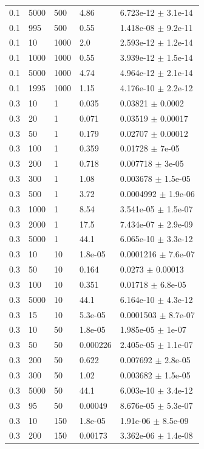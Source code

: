 \begin{longtable}{lllll}
	0.1 & 5000 & 500 & 4.86 & 6.723e-12 $\pm$ 3.1e-14 \\
	0.1 & 995 & 500 & 0.55 & 1.418e-08 $\pm$ 9.2e-11 \\
	0.1 & 10 & 1000 & 2.0 & 2.593e-12 $\pm$ 1.2e-14 \\
	0.1 & 1000 & 1000 & 0.55 & 3.939e-12 $\pm$ 1.5e-14 \\
	0.1 & 5000 & 1000 & 4.74 & 4.964e-12 $\pm$ 2.1e-14 \\
	0.1 & 1995 & 1000 & 1.15 & 4.176e-10 $\pm$ 2.2e-12 \\
	0.3 & 10 & 1 & 0.035 & 0.03821 $\pm$ 0.0002 \\
	0.3 & 20 & 1 & 0.071 & 0.03519 $\pm$ 0.00017 \\
	0.3 & 50 & 1 & 0.179 & 0.02707 $\pm$ 0.00012 \\
	0.3 & 100 & 1 & 0.359 & 0.01728 $\pm$ 7e-05 \\
	0.3 & 200 & 1 & 0.718 & 0.007718 $\pm$ 3e-05 \\
	0.3 & 300 & 1 & 1.08 & 0.003678 $\pm$ 1.5e-05 \\
	0.3 & 500 & 1 & 3.72 & 0.0004992 $\pm$ 1.9e-06 \\
	0.3 & 1000 & 1 & 8.54 & 3.541e-05 $\pm$ 1.5e-07 \\
	0.3 & 2000 & 1 & 17.5 & 7.434e-07 $\pm$ 2.9e-09 \\
	0.3 & 5000 & 1 & 44.1 & 6.065e-10 $\pm$ 3.3e-12 \\
	0.3 & 10 & 10 & 1.8e-05 & 0.0001216 $\pm$ 7.6e-07 \\
	0.3 & 50 & 10 & 0.164 & 0.0273 $\pm$ 0.00013 \\
	0.3 & 100 & 10 & 0.351 & 0.01718 $\pm$ 6.8e-05 \\
	0.3 & 5000 & 10 & 44.1 & 6.164e-10 $\pm$ 4.3e-12 \\
	0.3 & 15 & 10 & 5.3e-05 & 0.0001503 $\pm$ 8.7e-07 \\
	0.3 & 10 & 50 & 1.8e-05 & 1.985e-05 $\pm$ 1e-07 \\
	0.3 & 50 & 50 & 0.000226 & 2.405e-05 $\pm$ 1.1e-07 \\
	0.3 & 200 & 50 & 0.622 & 0.007692 $\pm$ 2.8e-05 \\
	0.3 & 300 & 50 & 1.02 & 0.003682 $\pm$ 1.5e-05 \\
	0.3 & 5000 & 50 & 44.1 & 6.003e-10 $\pm$ 3.4e-12 \\
	0.3 & 95 & 50 & 0.00049 & 8.676e-05 $\pm$ 5.3e-07 \\
	0.3 & 10 & 150 & 1.8e-05 & 1.91e-06 $\pm$ 8.5e-09 \\
	0.3 & 200 & 150 & 0.00173 & 3.362e-06 $\pm$ 1.4e-08 \\

\end{longtable}
